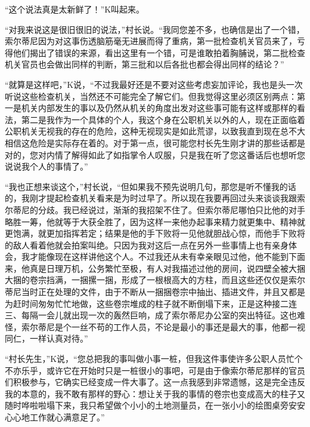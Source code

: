 \documentclass[12pt,a4paper]{article}
\begin{document}
“这个说法真是太新鲜了！”K叫起来。



“对我来说这是很旧很旧的说法，”村长说。“我同您差不多，也确信是出了一个错，索尔蒂尼因为对这事伤透脑筋毫无进展而得了重病，第一批检查机关官员来了，亏得他们揭出了错误的来源，看出这里有一个错，可是谁敢拍着胸脯说，第二批检查机关官员也会做出同样的判断，第三批和以后各批也都会得出同样的结论？”



“就算是这样吧，”K说，“不过我最好还是不要对这些考虑妄加评论，我也是头一次听说这些检查机关，当然还不可能完全了解它们。但我觉得这里必须区别两点：第一是机关内部发生的事以及仍然从机关的角度出发对这些事可能有这样或那样的看法，第二是我作为一个具体的个人，我这个身在公职机关以外的人，现在正面临着公职机关无视我的存在的危险，这种无视现实是如此荒谬，以致我直到现在总不大相信这危险是实际存在着的。对于第一点，很可能您村长先生刚才讲的那些话都是对的，您对内情了解得如此了如指掌令人叹服，只是我在听了您这番话后也想听您说说我个人的事情了。”



“我也正想来谈这个，”村长说，“但如果我不预先说明几句，那您是听不懂我的话的，我刚才提起检查机关看来是为时过早了。所以现在我要再回过头来谈谈我跟索尔蒂尼的分歧。我已经说过，渐渐的我招架不住了。但索尔蒂尼哪怕只比他的对手略胜一筹，他就等于大获全胜了，因为这样一来他办起事来精力就更集中、精神就更饱满，就更加指挥若定；结果是他的手下败将一见他就胆战心惊，而他手下败将的敌人看着他就会拍案叫绝。只因为我对这后一点在另外一些事情上也有亲身体会，我才能像现在这样讲他这个人。不过我还从未有幸亲眼见过他，他不能到下面来，他真是日理万机，公务繁忙至极，有人对我描述过他的房间，说四壁全被大捆大捆的卷宗挡满，一捆摞一捆，形成了一根根高大的方柱，而且这些还仅仅是索尔蒂尼当时正在处理的文件，由于不断从一捆捆卷宗中抽出、插进文件，并且又都是为赶时间匆匆忙忙地做，这些卷宗堆成的柱子就不断倒塌下来，正是这种接二连三、每隔一会儿就出现一次的轰然巨响，成了索尔蒂尼办公室的突出特征。这也难怪，索尔蒂尼是个一丝不苟的工作人员，不论是最小的事还是最大的事，他都一视同仁，一样认真对待。”



“村长先生，”K说，“您总把我的事叫做小事一桩，但我这件事使许多公职人员忙个不亦乐乎，或许它在开始时只是一桩很小的事吧，可是由于像索尔蒂尼那样的官员们积极参与，它确实已经变成一件大事了。这一点我感到非常遗憾，这是完全违反我的本意的，我不敢有那样的野心：想让关于我的事情的卷宗也变成高大的柱子又随时哗啦啦塌下来，我只希望做个小小的土地测量员，在一张小小的绘图桌旁安安心心地工作就心满意足了。”
\end{document}

